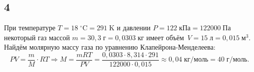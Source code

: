 \subsection{4}

При температуре $T=18\;^\circ\text{C}=291\;\text{K}$ и давлении $P=122\;\text{кПа}=122000\;\text{Па}$ некоторый газ массой $m=30{,}3\;\text{г}=0{,}0303\;\text{кг}$ имеет объём~$V=15\;\text{л}=0{,}015\;\text{м}^3$. Найдём молярную массу газа по уравнению Клапейрона-Менделеева:
\[
PV=\frac{m}{M}\cdot RT\Rightarrow M=\frac{mRT}{PV}=\frac{0{,}0303\cdot8{,}314\cdot291}{122000\cdot0{,}015}\approx0{,}04\;\text{кг/моль}=40\;\text{г/моль}.
\]